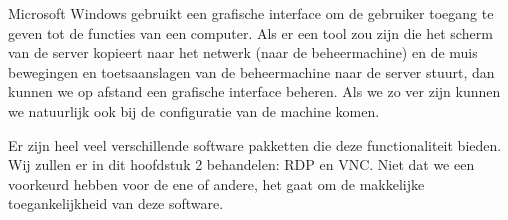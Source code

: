 Microsoft Windows gebruikt een grafische interface om de gebruiker toegang te geven tot de functies van een computer. Als er een tool zou zijn die het scherm van de server kopieert naar het netwerk (naar de beheermachine) en de muis bewegingen en toetsaanslagen van de beheermachine naar de server stuurt, dan kunnen we op afstand een grafische interface beheren. Als we zo ver zijn kunnen we natuurlijk ook bij de configuratie van de machine komen.

Er zijn heel veel verschillende software pakketten die deze functionaliteit bieden. Wij zullen er in dit hoofdstuk 2 behandelen: RDP en VNC. Niet dat we een voorkeurd hebben voor de ene of andere, het gaat om de makkelijke toegankelijkheid van deze software.

